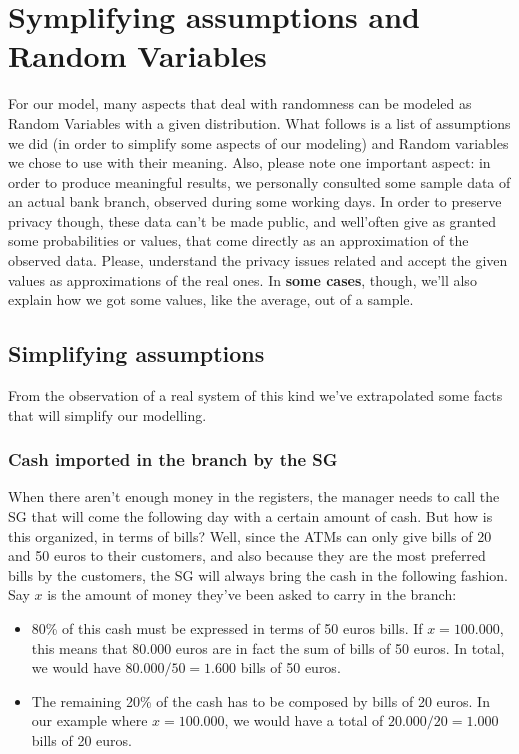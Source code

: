 \documentclass{article}
\begin{document}
\section{Symplifying assumptions and Random Variables}
For our model, many aspects that deal with randomness can be modeled as Random Variables with a given distribution. What follows is a list of assumptions we did (in order to simplify some aspects of our modeling) and Random variables we chose to use with their meaning. Also, please note one important aspect: in order to produce meaningful results, we personally consulted some sample data of an actual bank branch, observed during some working days. In order to preserve privacy though, these data can't be made public, and well'often give as granted some probabilities or values, that come directly as an approximation of the observed data. Please, understand the privacy issues related and accept the given values as approximations of the real ones. In \textbf{some cases}, though, we'll also explain how we got some values, like the average, out of a sample.

\subsection{Simplifying assumptions}
From the observation of a real system of this kind we've extrapolated some facts that will simplify our modelling.
\subsubsection{Cash imported in the branch by the SG}
When there aren't enough money in the registers, the manager needs to call the SG that will come the following day with a certain amount of cash. But how is this organized, in terms of bills? Well, since the ATMs can only give bills of 20 and 50 euros to their customers, and also because they are the most preferred bills by the customers, the SG will always bring the cash in the following fashion. Say $x$ is the amount of money they've been asked to carry in the branch:
\begin{itemize}
    \item 80\% of this cash must be expressed in terms of 50 euros bills. If $x = 100.000$, this means that 80.000 euros are in fact the sum of bills of 50 euros. In total, we would have $80.000 / 50 = 1.600$ bills of 50 euros.
    \item The remaining 20\% of the cash has to be composed by bills of 20 euros. In our example where $x = 100.000$, we would have a total of $20.000 / 20 = 1.000$ bills of 20 euros.  
\end{itemize}
\end{document}
